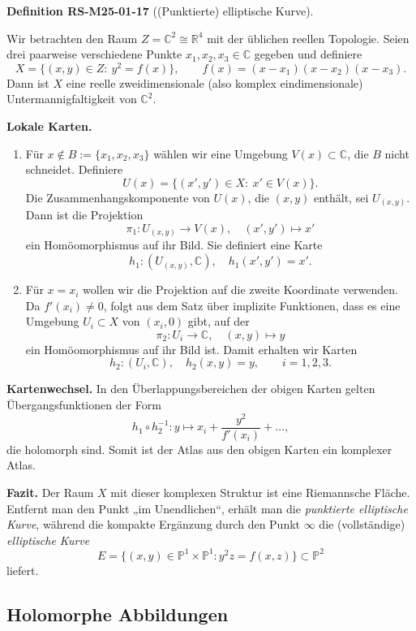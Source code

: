 \documentclass[10pt, letterpaper]{article}
\newcommand{\R}{\mathbb{R}}
\newcommand{\C}{\mathbb{C}}
\newcommand{\CustomHeading}[3]{%
  \par\medskip\noindent%
  \textbf{#1 #2} \textnormal{(#3)}.\enskip%
}
\newenvironment{DEF}[2]{\begin{unitbox}\CustomHeading{Definition}{#1}{#2}}{\end{unitbox}}
\begin{document}
\begin{DEF}{RS-M25-01-17}{(Punktierte) elliptische Kurve}
Wir betrachten den Raum $Z=\C^2\cong\R^4$ mit der üblichen reellen Topologie.
Seien drei paarweise verschiedene Punkte $x_1,x_2,x_3\in\C$ gegeben und definiere
\[
X=\{(x,y)\in Z:\ y^2=f(x)\},\qquad f(x)=(x-x_1)(x-x_2)(x-x_3).
\]
Dann ist $X$ eine reelle zweidimensionale (also komplex eindimensionale)
Untermannigfaltigkeit von $\C^2$.

\textbf{Lokale Karten.}
\begin{enumerate}
\item Für $x\notin B:=\{x_1,x_2,x_3\}$ wählen wir eine Umgebung $V(x)\subset\C$, die $B$ nicht schneidet.
Definiere
\[
U(x)=\{(x',y')\in X:\ x'\in V(x)\}.
\]
Die Zusammenhangskomponente von $U(x)$, die $(x,y)$ enthält, sei $U_{(x,y)}$.
Dann ist die Projektion
\[
\pi_1:U_{(x,y)}\to V(x),\quad (x',y')\mapsto x'
\]
ein Homöomorphismus auf ihr Bild. Sie definiert eine Karte
\[
h_1:(U_{(x,y)},\C),\quad h_1(x',y')=x'.
\]
\item Für $x=x_i$ wollen wir die Projektion auf die zweite Koordinate verwenden.
Da $f'(x_i)\neq 0$, folgt aus dem Satz über implizite Funktionen, dass es eine
Umgebung $U_i\subset X$ von $(x_i,0)$ gibt, auf der
\[
\pi_2:U_i\to\C,\quad (x,y)\mapsto y
\]
ein Homöomorphismus auf ihr Bild ist.
Damit erhalten wir Karten
\[
h_2:(U_i,\C),\quad h_2(x,y)=y,\qquad i=1,2,3.
\]
\end{enumerate}

\textbf{Kartenwechsel.}
In den Überlappungsbereichen der obigen Karten gelten Übergangsfunktionen der Form
\[
h_1\circ h_2^{-1}: y\mapsto x_i+\frac{y^2}{f'(x_i)}+\dots,
\]
die holomorph sind. Somit ist der Atlas aus den obigen Karten ein komplexer Atlas.

\textbf{Fazit.}
Der Raum $X$ mit dieser komplexen Struktur ist eine Riemannsche Fläche. Entfernt man den Punkt
„im Unendlichen“, erhält man die \emph{punktierte elliptische Kurve}, während die kompakte
Ergänzung durch den Punkt $\infty$ die (vollständige) \emph{elliptische Kurve}
\[
E=\{(x,y)\in\mathbb{P}^1\times\mathbb{P}^1: y^2z=f(x,z)\}\subset\mathbb{P}^2
\]
liefert.
\end{DEF}




\pagebreak




\subsection {Holomorphe Abbildungen}
\end{document}
